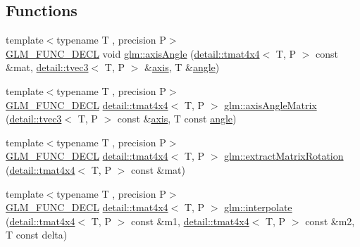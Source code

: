 \subsection*{Functions}
\begin{DoxyCompactItemize}
\item 
{\footnotesize template$<$typename T , precision P$>$ }\\\hyperlink{setup_8hpp_ab2d052de21a70539923e9bcbf6e83a51}{G\+L\+M\+\_\+\+F\+U\+N\+C\+\_\+\+D\+E\+CL} void \hyperlink{group__gtx__matrix__interpolation_gadf049332345bf754b63fe24a914f8fac}{glm\+::axis\+Angle} (\hyperlink{structglm_1_1detail_1_1tmat4x4}{detail\+::tmat4x4}$<$ T, P $>$ const \&mat, \hyperlink{structglm_1_1detail_1_1tvec3}{detail\+::tvec3}$<$ T, P $>$ \&\hyperlink{group__gtc__quaternion_ga8eef9f8c3f2e4836dccf09df975b20fb}{axis}, T \&\hyperlink{group__gtc__quaternion_ga23a3fc7ada5bbb665ff84c92c6e0542c}{angle})
\item 
{\footnotesize template$<$typename T , precision P$>$ }\\\hyperlink{setup_8hpp_ab2d052de21a70539923e9bcbf6e83a51}{G\+L\+M\+\_\+\+F\+U\+N\+C\+\_\+\+D\+E\+CL} \hyperlink{structglm_1_1detail_1_1tmat4x4}{detail\+::tmat4x4}$<$ T, P $>$ \hyperlink{group__gtx__matrix__interpolation_gafc6982aa7c8e8198b21f038f51fc4b90}{glm\+::axis\+Angle\+Matrix} (\hyperlink{structglm_1_1detail_1_1tvec3}{detail\+::tvec3}$<$ T, P $>$ const \&\hyperlink{group__gtc__quaternion_ga8eef9f8c3f2e4836dccf09df975b20fb}{axis}, T const \hyperlink{group__gtc__quaternion_ga23a3fc7ada5bbb665ff84c92c6e0542c}{angle})
\item 
{\footnotesize template$<$typename T , precision P$>$ }\\\hyperlink{setup_8hpp_ab2d052de21a70539923e9bcbf6e83a51}{G\+L\+M\+\_\+\+F\+U\+N\+C\+\_\+\+D\+E\+CL} \hyperlink{structglm_1_1detail_1_1tmat4x4}{detail\+::tmat4x4}$<$ T, P $>$ \hyperlink{group__gtx__matrix__interpolation_gacb1e3e76c1710d89a1852d87d58c021e}{glm\+::extract\+Matrix\+Rotation} (\hyperlink{structglm_1_1detail_1_1tmat4x4}{detail\+::tmat4x4}$<$ T, P $>$ const \&mat)
\item 
{\footnotesize template$<$typename T , precision P$>$ }\\\hyperlink{setup_8hpp_ab2d052de21a70539923e9bcbf6e83a51}{G\+L\+M\+\_\+\+F\+U\+N\+C\+\_\+\+D\+E\+CL} \hyperlink{structglm_1_1detail_1_1tmat4x4}{detail\+::tmat4x4}$<$ T, P $>$ \hyperlink{group__gtx__matrix__interpolation_gad7dbb702234767be1b4d3c191a2327ac}{glm\+::interpolate} (\hyperlink{structglm_1_1detail_1_1tmat4x4}{detail\+::tmat4x4}$<$ T, P $>$ const \&m1, \hyperlink{structglm_1_1detail_1_1tmat4x4}{detail\+::tmat4x4}$<$ T, P $>$ const \&m2, T const delta)
\end{DoxyCompactItemize}


